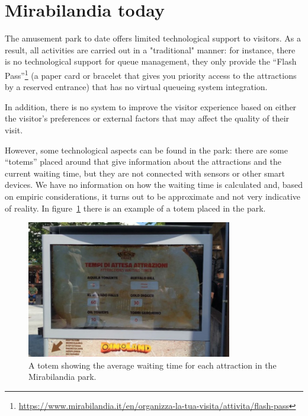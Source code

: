 \section{Mirabilandia today}\label{sec:mirabilandia-today}
The amusement park to date offers limited technological support to visitors.
As a result, all activities are carried out in a "traditional" manner:
for instance, there is no technological support for queue management, they only provide the
``Flash Pass''\footnote{\url{https://www.mirabilandia.it/en/organizza-la-tua-visita/attivita/flash-pass}} (a paper card or bracelet that gives you
priority access to the attractions by a reserved entrance) that has no virtual queueing system integration.

In addition, there is no system to improve the visitor experience based on either the visitor's preferences or external factors that may affect the
quality of their visit.

However, some technological aspects can be found in the park:
there are some ``totems'' placed around that give information about the attractions and the current waiting time, but they are not connected with sensors or other smart devices.
We have no information on how the waiting time is calculated and, based on empiric considerations, it turns out to be approximate and not very indicative of reality.
In figure~\ref{fig:mira-totem} there is an example of a totem placed in the park.

\begin{figure}[H]
	\centering
	\includegraphics[width=0.8\textwidth]{img/mira-totem.jpg}
	\caption{A totem showing the average waiting time for each attraction in the Mirabilandia park.}
	\label{fig:mira-totem}
\end{figure}

